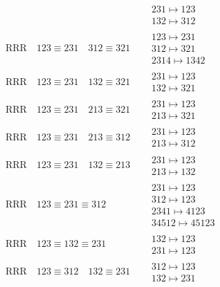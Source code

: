 \documentclass{article}
\begin{document}
\begin{align}
\quad
&
\begin{matrix}
231 \mapsto 123
\\
132 \mapsto 312
\end{matrix}
\\
\text{RRR}
\quad
123\equiv231
\quad
312\equiv321
\quad
&
\begin{matrix}
123 \mapsto 231
\\
312 \mapsto 321
\\
2314 \mapsto 1342
\end{matrix}
\\
\text{RRR}
\quad
123\equiv231
\quad
132\equiv321
\quad
&
\begin{matrix}
231 \mapsto 123
\\
132 \mapsto 321
\end{matrix}
\\
\text{RRR}
\quad
123\equiv231
\quad
213\equiv321
\quad
&
\begin{matrix}
231 \mapsto 123
\\
213 \mapsto 321
\end{matrix}
\\
\text{RRR}
\quad
123\equiv231
\quad
213\equiv312
\quad
&
\begin{matrix}
231 \mapsto 123
\\
213 \mapsto 312
\end{matrix}
\\
\text{RRR}
\quad
123\equiv231
\quad
132\equiv213
\quad
&
\begin{matrix}
231 \mapsto 123
\\
213 \mapsto 132
\end{matrix}
\\
\text{RRR}
\quad
123\equiv231\equiv312
\quad
&
\begin{matrix}
231 \mapsto 123
\\
312 \mapsto 123
\\
2341 \mapsto 4123
\\
34512 \mapsto 45123
\end{matrix}
\\
\text{RRR}
\quad
123\equiv132\equiv231
\quad
&
\begin{matrix}
132 \mapsto 123
\\
231 \mapsto 123
\end{matrix}
\\
\text{RRR}
\quad
123\equiv312
\quad
132\equiv231
\quad
&
\begin{matrix}
312 \mapsto 123
\\
132 \mapsto 231
\end{matrix}

\end{align}
\end{document}
